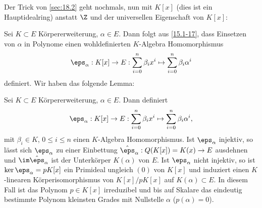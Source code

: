 Der Trick von \ref{sec:18.2} geht nochmals, nun mit $K[x]$ (dies ist ein Hauptidealring) anstatt $\Z$ und der universellen Eigenschaft von $K[x]$:

Sei $K \subset E$ Körpererweiterung, $\alpha \in E$.
Dann folgt aus \ref{15.1-17}, dass Einsetzen von $\alpha$ in Polynome einen wohldefinierten $K$-Algebra Homomorphismus
\[
	\eps_\alpha : K[x] \to E : \sum_{i=0}^n \beta_i x^i \mapsto \sum_{i=0}^n \beta_i \alpha^i
\]
definiert.
Wir haben das folgende Lemma:

\setcounter{thm}{0}
\begin{lem} \label{18.3-1}
	Sei $K \subset E$ Körpererweiterung, $\alpha \in E$.
	Dann definiert
	\[
		\eps_\alpha: K[x] \to E: \sum_{i=0}^n \beta_i x^i \mapsto \sum_{i=0}^n \beta_i \alpha^i,
	\]
	mit $\beta_i \in K$, $0 \le i \le n$ einen $K$-Algebra Homomorphismus.
	Ist $\eps_\alpha$ injektiv, so lässt sich $\eps_\alpha$ zu einer Einbettung $\hat \eps_\alpha: Q(K[x]) = K(x) \to E$ ausdehnen und $\im \hat \eps_\alpha$ ist der Unterkörper $K(\alpha)$ von $E$.
	Ist $\eps_\alpha$ nicht injektiv, so ist $\ker \eps_\alpha = pK[x]$ ein Primideal ungleich $(0)$ von $K[x]$ und induziert einen $K$-linearen Körperisomorphismus von $K[x] / pK[x]$ auf $K(\alpha) \subset E$.
	In diesem Fall ist das Polynom $p \in K[x]$ irreduzibel und bis auf Skalare das eindeutig bestimmte Polynom kleinsten Grades mit Nullstelle $\alpha$ ($p(\alpha) = 0$).
\end{lem}

